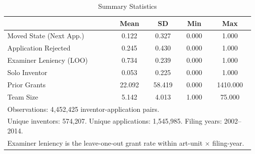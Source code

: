 \begin{table}[t]
\centering
\caption{Summary Statistics}
\label{tab:summary}
\begin{tabular}{lcccc}
\hline\hline
 & Mean & SD & Min & Max \\
\hline
Moved State (Next App.) & 0.122 & 0.327 & 0.000 & 1.000 \\
Application Rejected & 0.245 & 0.430 & 0.000 & 1.000 \\
Examiner Leniency (LOO) & 0.734 & 0.239 & 0.000 & 1.000 \\
Solo Inventor & 0.053 & 0.225 & 0.000 & 1.000 \\
Prior Grants & 22.092 & 58.419 & 0.000 & 1410.000 \\
Team Size & 5.142 & 4.013 & 1.000 & 75.000 \\
\hline
\multicolumn{5}{l}{\footnotesize Observations: 4,452,425 inventor-application pairs.} \\
\multicolumn{5}{l}{\footnotesize Unique inventors: 574,207. Unique applications: 1,545,985. Filing years: 2002--2014.} \\
\multicolumn{5}{l}{\footnotesize Examiner leniency is the leave-one-out grant rate within art-unit $\times$ filing-year.} \\
\hline\hline
\end{tabular}
\end{table}
